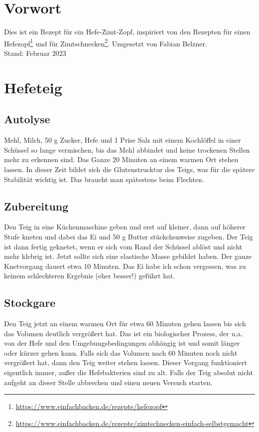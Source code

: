 \documentclass[a4paper, oneside]{recipe}
\begin{document}

\section*{Vorwort}
Dies ist ein Rezept für ein Hefe-Zimt-Zopf, inspiriert von den Rezepten für einen Hefezopf\footnote{\url{https://www.einfachbacken.de/rezepte/hefezopf}} und für Zimtschnecken\footnote{\url{https://www.einfachbacken.de/rezepte/zimtschnecken-einfach-selbstgemacht}}. Umgesetzt von Fabian Belzner.\\

Stand: Februar 2023

\section*{Hefeteig}
\subsection*{Autolyse}
Mehl, Milch, 50 g Zucker, Hefe und 1 Prise Salz mit einem Kochlöffel in einer Schüssel so lange vermischen, bis das Mehl abbindet und keine trockenen Stellen mehr zu erkennen sind. Das Ganze 20 Minuten an einem warmen Ort stehen lassen. In dieser Zeit bildet sich die Glutenstrucktur des Teigs, was für die spätere Stabilität wichtig ist. Das braucht man spätestens beim Flechten.

\subsection*{Zubereitung}
Den Teig in eine Küchenmaschine geben und erst auf kleiner, dann auf höherer Stufe kneten und dabei das Ei und 50 g Butter stückchenweise zugeben. Der Teig ist dann fertig geknetet, wenn er sich vom Rand der Schüssel ablöst und nicht mehr klebrig ist. Jetzt sollte sich eine elastische Masse gebildet haben. Der ganze Knetvorgang dauert etwa 10 Minuten. Das Ei habe ich schon vergessen, was zu keinem schlechteren Ergebnis (eher besser!) geführt hat.

\subsection*{Stockgare}
Den Teig jetzt an einem warmen Ort für etwa 60 Minuten gehen lassen bis sich das Volumen deutlich vergrößert hat. Das ist ein biologischer Prozess, der u.a. von der Hefe und den Umgebungsbedingungen abhängig ist und somit länger oder kürzer gehen kann. Falls sich das Volumen nach 60 Minuten noch nicht vergrößert hat, dann den Teig weiter stehen lassen. Dieser Vorgang funktioniert eigentlich immer, außer die Hefebakterien sind zu alt. Falls der Teig absolut nicht aufgeht an dieser Stelle abbrechen und einen neuen Versuch starten. 
\end{document}
